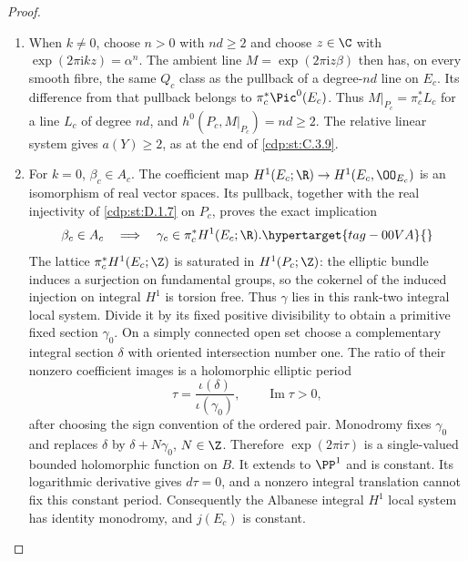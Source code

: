 \begin{proof}
\begin{enumerate}[leftmargin=*]
\item When $k\ne0$, choose $n>0$ with $nd\ge2$ and choose
$z\in\C$ with $\exp(2\pi\mathrm i kz)=\alpha^n$.
The ambient line $M=\exp(2\pi\mathrm i z\beta)$ then
has, on every smooth fibre, the same $Q_c$ class as the
pullback of a degree-$nd$ line on $E_c$. Its difference
from that pullback belongs to $\pi_c^*\Pic^0(E_c)$.
Thus
$M|_{P_c}=\pi_c^*L_c$ for a line $L_c$ of degree $nd$,
and $h^0(P_c,M|_{P_c})=nd\ge2$. The relative linear
system gives $a(Y)\ge2$, as at the end of \ref{cdp:st:C.3.9}.
\item For $k=0$, $\beta_c\in A_c$. The coefficient map
$H^1(E_c;\R)\to H^1(E_c,\OO_{E_c})$ is an isomorphism
of real vector spaces. Its pullback, together with the real
injectivity of \ref{cdp:st:D.1.7} on $P_c$, proves the exact implication
\begin{equation}
 \beta_c\in A_c
 \quad\Longrightarrow\quad
 \gamma_c\in\pi_c^*H^1(E_c;\R).
\hypertarget{tag-00VA}{}\label{cdp:eq:C.PK.3}
\end{equation}
The lattice $\pi_c^*H^1(E_c;\Z)$ is saturated in
$H^1(P_c;\Z)$: the elliptic bundle induces a surjection
on fundamental groups, so the cokernel of the induced
injection on integral $H^1$ is torsion free. Thus $\gamma$
lies in this rank-two integral local system. Divide it by
its fixed positive divisibility to obtain a primitive fixed
section $\gamma_0$. On a simply connected open set choose
a complementary integral section $\delta$ with oriented
intersection number one. The ratio of their nonzero
coefficient images is a holomorphic elliptic period
\[
 \tau=\frac{\iota(\delta)}{\iota(\gamma_0)},
 \qquad \operatorname{Im}\tau>0,
\]
after choosing the sign convention of the ordered pair.
Monodromy fixes $\gamma_0$ and replaces $\delta$ by
$\delta+N\gamma_0$, $N\in\Z$. Therefore
$\exp(2\pi\mathrm i\tau)$ is a single-valued bounded
holomorphic function on $B$. It extends to $\PP^1$ and
is constant. Its logarithmic derivative gives $d\tau=0$,
and a nonzero integral translation cannot fix this constant
period. Consequently the Albanese integral $H^1$ local
system has identity monodromy, and $j(E_c)$ is constant.


\end{enumerate}
\end{proof}
